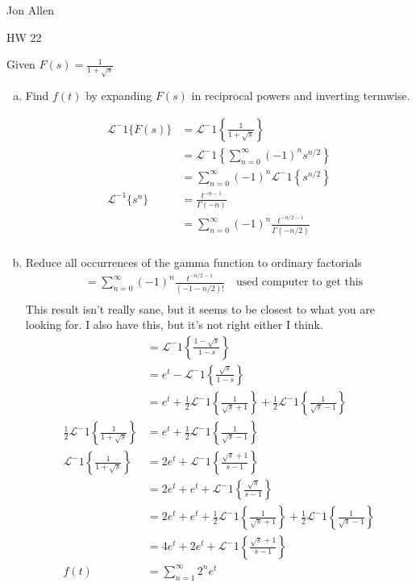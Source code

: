 \documentclass{article}
\begin{document}
Jon Allen

HW 22

Given $F(s)=\frac{1}{1+\sqrt{s}}$
\begin{enumerate}[(a)]
\item
Find $f(t)$ by expanding $F(s)$ in reciprocal powers and inverting termwise.

\begin{align*}
  \mathcal{L}^-1\{F(s)\}&=\mathcal{L}^-1\left\{\frac{1}{1+\sqrt{s}}\right\}\\
  &=\mathcal{L}^-1\left\{\sum\limits_{n=0}^\infty{(-1)^ns^{n/2}}\right\}\\
  &=\sum\limits_{n=0}^\infty{(-1)^n\mathcal{L}^-1\left\{s^{n/2}\right\}}\\
  \mathcal{L}^{-1}\{s^n\}&=\frac{t^{-n-1}}{\Gamma(-n)}\\
  &=\sum\limits_{n=0}^\infty{(-1)^n\frac{t^{-n/2-1}}{\Gamma(-n/2)}}\\
\end{align*}
\item
Reduce all occurrences of the gamma function to ordinary factorials
\begin{align*}
  &=\sum\limits_{n=0}^\infty{(-1)^n\frac{t^{-n/2-1}}{(-1-n/2)!}}\quad\text{used computer to get this}\\
\end{align*}
This result isn't really sane, but it seems to be closest to what you are looking for. I also have this, but it's not right either I think.
\begin{align*}
  &=\mathcal{L}^-1\left\{\frac{1-\sqrt{s}}{1-s}\right\}\\
  &=e^t-\mathcal{L}^-1\left\{\frac{\sqrt{s}}{1-s}\right\}\\
  &=e^t+\frac{1}{2}\mathcal{L}^-1\left\{\frac{1}{\sqrt{s}+1}\right\}+\frac{1}{2}\mathcal{L}^-1\left\{\frac{1}{\sqrt{s}-1}\right\}\\
  \frac{1}{2}\mathcal{L}^-1\left\{\frac{1}{1+\sqrt{s}}\right\}&=e^t+\frac{1}{2}\mathcal{L}^-1\left\{\frac{1}{\sqrt{s}-1}\right\}\\
  \mathcal{L}^-1\left\{\frac{1}{1+\sqrt{s}}\right\}&=2e^t+\mathcal{L}^-1\left\{\frac{\sqrt{s}+1}{s-1}\right\}\\
  &=2e^t+e^t+\mathcal{L}^-1\left\{\frac{\sqrt{s}}{s-1}\right\}\\
  &=2e^t+e^t+\frac{1}{2}\mathcal{L}^-1\left\{\frac{1}{\sqrt{s}+1}\right\}+\frac{1}{2}\mathcal{L}^-1\left\{\frac{1}{\sqrt{s}-1}\right\}\\
  &=4e^t+2e^t+\mathcal{L}^-1\left\{\frac{\sqrt{s}+1}{s-1}\right\}\\
  f(t)&=\sum\limits_{n=1}^\infty{2^ne^t}
\end{align*}
\end{enumerate}
\end{document}
